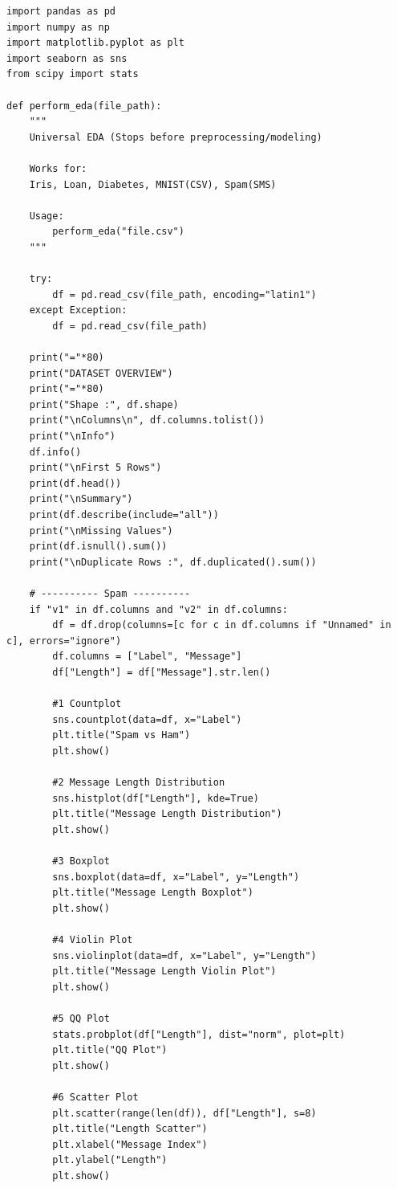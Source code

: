 \documentclass[12pt,a4paper]{article}
\begin{document}
\begin{lstlisting}[caption={Complete Universal EDA Implementation Code (perform\_EDA)}]
import pandas as pd
import numpy as np
import matplotlib.pyplot as plt
import seaborn as sns
from scipy import stats

def perform_eda(file_path):
    """
    Universal EDA (Stops before preprocessing/modeling)

    Works for:
    Iris, Loan, Diabetes, MNIST(CSV), Spam(SMS)

    Usage:
        perform_eda("file.csv")
    """

    try:
        df = pd.read_csv(file_path, encoding="latin1")
    except Exception:
        df = pd.read_csv(file_path)

    print("="*80)
    print("DATASET OVERVIEW")
    print("="*80)
    print("Shape :", df.shape)
    print("\nColumns\n", df.columns.tolist())
    print("\nInfo")
    df.info()
    print("\nFirst 5 Rows")
    print(df.head())
    print("\nSummary")
    print(df.describe(include="all"))
    print("\nMissing Values")
    print(df.isnull().sum())
    print("\nDuplicate Rows :", df.duplicated().sum())

    # ---------- Spam ----------
    if "v1" in df.columns and "v2" in df.columns:
        df = df.drop(columns=[c for c in df.columns if "Unnamed" in c], errors="ignore")
        df.columns = ["Label", "Message"]
        df["Length"] = df["Message"].str.len()

        #1 Countplot
        sns.countplot(data=df, x="Label")
        plt.title("Spam vs Ham")
        plt.show()

        #2 Message Length Distribution
        sns.histplot(df["Length"], kde=True)
        plt.title("Message Length Distribution")
        plt.show()

        #3 Boxplot
        sns.boxplot(data=df, x="Label", y="Length")
        plt.title("Message Length Boxplot")
        plt.show()

        #4 Violin Plot
        sns.violinplot(data=df, x="Label", y="Length")
        plt.title("Message Length Violin Plot")
        plt.show()

        #5 QQ Plot
        stats.probplot(df["Length"], dist="norm", plot=plt)
        plt.title("QQ Plot")
        plt.show()

        #6 Scatter Plot
        plt.scatter(range(len(df)), df["Length"], s=8)
        plt.title("Length Scatter")
        plt.xlabel("Message Index")
        plt.ylabel("Length")
        plt.show()


\end{lstlisting}
\end{document}
